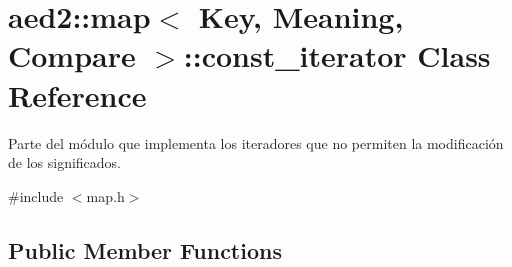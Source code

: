 \hypertarget{classaed2_1_1map_1_1const__iterator}{\section{aed2\-:\-:map$<$ \-Key, \-Meaning, \-Compare $>$\-:\-:const\-\_\-iterator \-Class \-Reference}
\label{classaed2_1_1map_1_1const__iterator}
}


\-Parte del módulo que implementa los iteradores que no permiten la modificación de los significados.  




{\ttfamily \#include $<$map.\-h$>$}

\subsection*{\-Public \-Member \-Functions}
